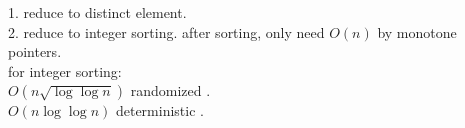 \documentclass{article}
\newcommand{\Acknowledgements}[1]{\ \\{\bf Acknowledgements:} #1}
\begin{document}


1. reduce to distinct element.\\

2. reduce to integer sorting. after sorting, only need $O(n)$ by monotone pointers.\\
for integer sorting:\\
$O(n\sqrt{\log\log n})$ randomized \cite{han2002sorting}.\\
$O(n\log \log n)$ deterministic \cite{han2002deterministic}.\\







\end{document}
